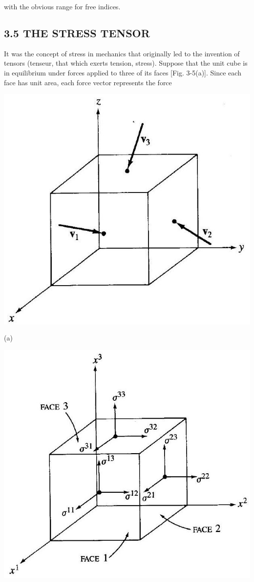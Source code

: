 \documentclass[10pt]{article}
\begin{document}
with the obvious range for free indices.

\subsection*{3.5 THE STRESS TENSOR}
It was the concept of stress in mechanics that originally led to the invention of tensors (tenseur, that which exerts tension, stress). Suppose that the unit cube is in equilibrium under forces applied to three of its faces [Fig. 3-5(a)]. Since each face has unit area, each force vector represents the force

\begin{center}
\includegraphics[max width=\textwidth]{2024_04_03_41f90be4f896e21f0dc9g-039}
\end{center}

(a)

\begin{center}
\includegraphics[max width=\textwidth]{2024_04_03_41f90be4f896e21f0dc9g-039(1)}
\end{center}
\end{document}
